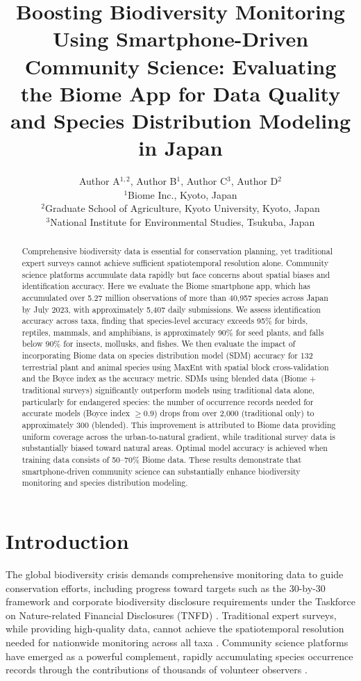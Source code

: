 \documentclass[11pt]{article}
\title{Boosting Biodiversity Monitoring Using Smartphone-Driven Community Science: Evaluating the Biome App for Data Quality and Species Distribution Modeling in Japan}
\author{Author A$^{1,2}$, Author B$^{1}$, Author C$^{3}$, Author D$^{2}$ \\
\small $^{1}$Biome Inc., Kyoto, Japan \\
\small $^{2}$Graduate School of Agriculture, Kyoto University, Kyoto, Japan \\
\small $^{3}$National Institute for Environmental Studies, Tsukuba, Japan}
\date{}
\begin{document}
\maketitle

\begin{abstract}
Comprehensive biodiversity data is essential for conservation planning, yet traditional expert surveys cannot achieve sufficient spatiotemporal resolution alone. Community science platforms accumulate data rapidly but face concerns about spatial biases and identification accuracy. Here we evaluate the Biome smartphone app, which has accumulated over 5.27 million observations of more than 40,957 species across Japan by July 2023, with approximately 5,407 daily submissions. We assess identification accuracy across taxa, finding that species-level accuracy exceeds 95\% for birds, reptiles, mammals, and amphibians, is approximately 90\% for seed plants, and falls below 90\% for insects, mollusks, and fishes. We then evaluate the impact of incorporating Biome data on species distribution model (SDM) accuracy for 132 terrestrial plant and animal species using MaxEnt with spatial block cross-validation and the Boyce index as the accuracy metric. SDMs using blended data (Biome + traditional surveys) significantly outperform models using traditional data alone, particularly for endangered species: the number of occurrence records needed for accurate models (Boyce index $\geq 0.9$) drops from over 2,000 (traditional only) to approximately 300 (blended). This improvement is attributed to Biome data providing uniform coverage across the urban-to-natural gradient, while traditional survey data is substantially biased toward natural areas. Optimal model accuracy is achieved when training data consists of 50--70\% Biome data. These results demonstrate that smartphone-driven community science can substantially enhance biodiversity monitoring and species distribution modeling.
\end{abstract}

\section{Introduction}

The global biodiversity crisis demands comprehensive monitoring data to guide conservation efforts, including progress toward targets such as the 30-by-30 framework and corporate biodiversity disclosure requirements under the Taskforce on Nature-related Financial Disclosures (TNFD) \citep{cbd2022kunming, tnfd2023framework}. Traditional expert surveys, while providing high-quality data, cannot achieve the spatiotemporal resolution needed for nationwide monitoring across all taxa \citep{bayraktarov2019review}. Community science platforms have emerged as a powerful complement, rapidly accumulating species occurrence records through the contributions of thousands of volunteer observers \citep{dickinson2012citizen, bonney2009citizen}.
\end{document}
